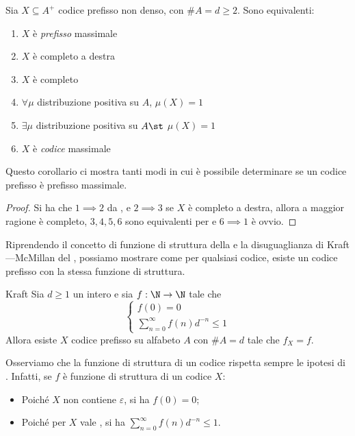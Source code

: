 \begin{corollary}{}
  Sia \(X \subseteq A^+\) codice prefisso non denso, con \(\# A = d \geq 2\). Sono equivalenti:
  \begin{enumerate}
    \item \(X\) è \textit{prefisso} massimale
    \item \(X\) è completo a destra
    \item \(X\) è completo
    \item \(\forall \mu\) distribuzione positiva su \(A\), \(\mu(X) = 1\)
    \item \(\exists \mu\) distribuzione positiva su \(A\st\) \(\mu(X) = 1\)
    \item \(X\) è \textit{codice} massimale
  \end{enumerate}
\end{corollary}

Questo corollario ci mostra tanti modi in cui è possibile determinare se un codice prefisso è prefisso massimale.

\begin{proof}
  Si ha che \(1 \implies 2\) da , e \(2 \implies 3\) se $X$ è completo a destra, allora a maggior ragione è completo, \(3,4,5,6\) sono equivalenti per  e \(6 \implies 1\) è ovvio.
\end{proof}

Riprendendo il concetto di funzione di struttura della  e la disuguaglianza di Kraft---McMillan del , possiamo mostrare come per qualsiasi codice, esiste un codice prefisso con la stessa funzione di struttura.

\begin{theorem}[label=thm:kraft]{Kraft}
  Sia \(d \geq 1\) un intero e sia \(f: \N \to \N\) tale che 
  $$\begin{cases}
    f(0) = 0 \\
    \sum_{n=0}^\infty f(n)d^{-n} \leq 1
  \end{cases}$$
  Allora esiste \(X\) codice prefisso su alfabeto \(A\) con \(\#A = d\) tale che \(f_X = f\).
\end{theorem}

\begin{observation}{}
  Osserviamo che la funzione di struttura di un codice rispetta sempre le ipotesi di . Infatti, se $f$ è funzione di struttura di un codice $X$:
  \begin{itemize}
    \item Poiché $X$ non contiene $\varepsilon$, si ha \(f(0) = 0\);
    \item Poiché per $X$ vale , si ha $\sum_{n=0}^\infty f(n)d^{-n} \leq 1$.
  \end{itemize}
\end{observation}

